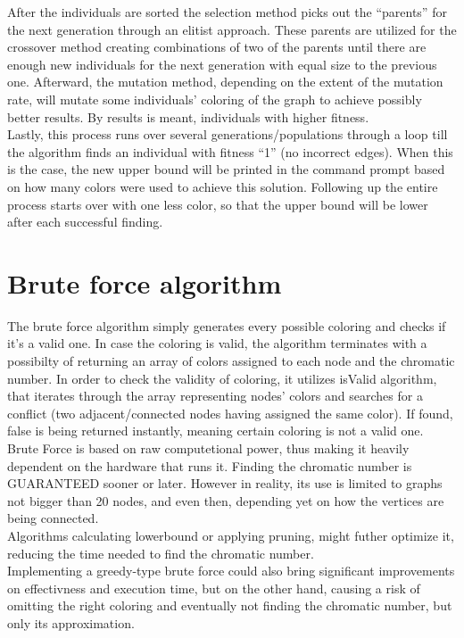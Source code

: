 \documentclass[a4paper]{report}
\begin{document}
		After the individuals are sorted the selection method picks out the “parents” for the next generation through an elitist approach. These parents are utilized for the crossover method creating combinations of two of the parents until there are enough new individuals for the next generation with equal size to the previous one. Afterward, the mutation method, depending on the extent of the mutation rate, will mutate some individuals’ coloring of the graph to achieve possibly better results. By results is meant, individuals with higher fitness.
\\
		
		Lastly, this process runs over several generations/populations through a loop till the algorithm finds an individual with fitness “1” (no incorrect edges). When this is the case, the new upper bound will be printed in the command prompt based on how many colors were used to achieve this solution. Following up the entire process starts over with one less color, so that the upper bound will be lower after each successful finding.
		
		
		\section{Brute force algorithm}
		The brute force algorithm simply generates every possible coloring and checks if it's a valid one. In case the coloring is valid, the algorithm terminates with a possibilty of returning an array of colors assigned to each node and the chromatic number. In order to check the validity of coloring, it utilizes isValid algorithm, that iterates through the array representing nodes' colors and searches for a conflict (two adjacent/connected nodes having assigned the same color). If found, false is being returned instantly, meaning certain coloring is not a valid one.
\\
		
		Brute Force is based on raw computetional power, thus making it heavily dependent on the hardware that runs it. Finding the chromatic number is GUARANTEED sooner or later. However in reality, its use is limited to graphs not bigger than 20 nodes, and even then, depending yet on how the vertices are being connected.
\\
		
		Algorithms calculating lowerbound or applying pruning, might futher optimize it, reducing the time needed to find the chromatic number. 
\\
		
		Implementing a greedy-type brute force could also bring significant improvements on effectivness and execution time, but on the other hand, causing a risk of omitting the right coloring and eventually not finding the chromatic number, but only its approximation.
		
\end{document}
